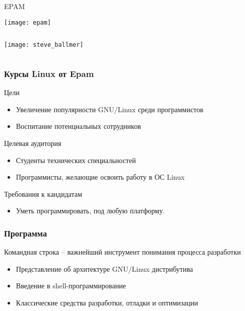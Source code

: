 \begin{frame}{EPAM}
  \begin{center}
    \texttt{[image: epam]}
  \end{center}
\end{frame}

\begin{frame}{}
	\begin{columns}
		\Huge
		\center\texttt{[image: steve\_ballmer]}
	\end{columns}
\end{frame}


\begin{frame}
	\frametitle{Курсы Linux от Epam}

	\begin{block}{Цели}
		\begin{itemize}
			\item Увеличение популярности GNU/Linux среди программистов
			\item Воспитание потенциальных сотрудников
		\end{itemize}
	\end{block}

	\pause

	\begin{block}{Целевая аудитория}
		\begin{itemize}
			\item Студенты технических специальностей
			\item Программисты, желающие освоить работу в ОС Linux
		\end{itemize}
	\end{block}

	\begin{block}{Требования к кандидатам}
		\begin{itemize}
			\item Уметь программировать, под любую платформу.
		\end{itemize}
	\end{block}
\end{frame}

\begin{frame}
	\frametitle{Программа}

	\begin{block}{Командная строка -- важнейший инструмент понимания процесса разработки}
		\begin{itemize}
			\item Представление об архитектуре GNU/Linux дистрибутива
			\item Введение в shell-программирование
			\item Классические средства разработки, отладки и оптимизации
		\end{itemize}
	\end{block}
\end{frame}

